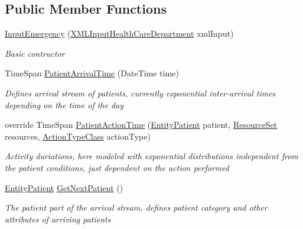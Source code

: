 \subsection*{Public Member Functions}
\begin{DoxyCompactItemize}
\item 
\hyperlink{class_sample_hospital_model_1_1_emergency_1_1_input_emergency_ad510a5add3497125528931575a3263c9}{Input\+Emergency} (\hyperlink{class_general_health_care_elements_1_1_input_1_1_x_m_l_input_health_care_department}{X\+M\+L\+Input\+Health\+Care\+Department} xml\+Input)
\begin{DoxyCompactList}\small\item\em Basic contructor \end{DoxyCompactList}\item 
Time\+Span \hyperlink{class_sample_hospital_model_1_1_emergency_1_1_input_emergency_ac583cde34f847949fd67ed314a6e6d43}{Patient\+Arrival\+Time} (Date\+Time time)
\begin{DoxyCompactList}\small\item\em Defines arrival stream of patients, currently exponential inter-\/arrival times depending on the time of the day \end{DoxyCompactList}\item 
override Time\+Span \hyperlink{class_sample_hospital_model_1_1_emergency_1_1_input_emergency_a40f8529ead5be85eccc0b481f15f329a}{Patient\+Action\+Time} (\hyperlink{class_general_health_care_elements_1_1_entities_1_1_entity_patient}{Entity\+Patient} patient, \hyperlink{class_general_health_care_elements_1_1_resource_handling_1_1_resource_set}{Resource\+Set} resources, \hyperlink{class_general_health_care_elements_1_1_general_classes_1_1_action_types_and_paths_1_1_action_type_class}{Action\+Type\+Class} action\+Type)
\begin{DoxyCompactList}\small\item\em Activity duriations, here modeled with exponential distributions independent from the patient conditions, just dependent on the action performed \end{DoxyCompactList}\item 
\hyperlink{class_general_health_care_elements_1_1_entities_1_1_entity_patient}{Entity\+Patient} \hyperlink{class_sample_hospital_model_1_1_emergency_1_1_input_emergency_a9ccb6d2e74db3fb55aa8e97136201745}{Get\+Next\+Patient} ()
\begin{DoxyCompactList}\small\item\em The patient part of the arrival stream, defines patient category and other attributes of arriving patients \end{DoxyCompactList}\item 

\end{DoxyCompactItemize}
